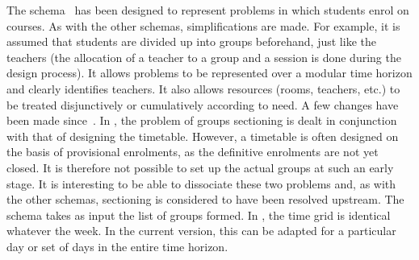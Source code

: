 \documentclass[runningheads]{llncs}
\begin{document}
The \UTP{} schema~\cite{2022_barichard_PATAT} has been designed to represent problems in which students enrol on courses. As with the other schemas, simplifications are made. For example, it is assumed that students are divided up into groups beforehand, just like the teachers (the allocation of a teacher to a group and a session is done during the design process). It allows problems to be represented over a modular time horizon and clearly identifies teachers. It also allows resources (rooms, teachers, etc.) to be treated disjunctively or cumulatively according to need. A few changes have been made since~\cite{2022_barichard_PATAT}. In \cite{2022_barichard_PATAT}, the problem of groups sectioning is dealt in conjunction with that of designing the timetable. However, a timetable is often designed on the basis of provisional enrolments, as the definitive enrolments are not yet closed. It is therefore not possible to set up the actual groups at such an early stage. It is interesting to be able to dissociate these two problems and, as with the other schemas, sectioning is considered to have been resolved upstream. The \UTP{} schema takes as input the list of groups formed. In \cite{2022_barichard_PATAT}, the time grid is identical whatever the week. In the current version, this can be adapted for a particular day or set of days in the entire time horizon.
\end{document}
